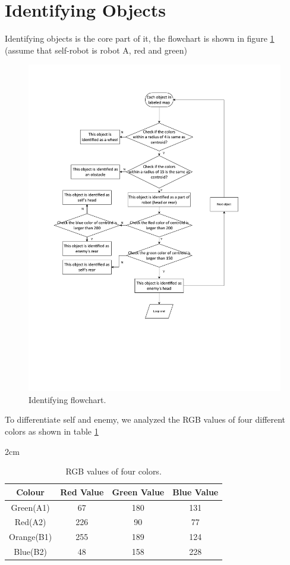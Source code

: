 \section{Identifying Objects}

Identifying objects is the core part of it, the flowchart is shown in figure \ref{Id_flow} (assume that self-robot is robot A, red and green)

\begin{figure}[thb]
    \centering
    \includegraphics[width=1\textwidth]{images/Id_flow.pdf}
    \caption[Identifying flowchart]{Identifying flowchart.}\label{Id_flow}
\end{figure}

To differentiate self and enemy, we analyzed the RGB values of four different colors as shown in table \ref{rgb_values}

\begin{table}[htbp]\small
    \addtolength{\leftskip} {2cm}
    \begin{tabular}{c|ccc}
    \hline 
    Colour&Red Value&Green Value&Blue Value\\
    \hline 
    Green(A1)&67&180&131\\
    Red(A2)&226&90&77\\
    Orange(B1)&255&189&124\\
    Blue(B2)&48&158&228\\
    \hline 
    \end{tabular}
    \caption[RGB values of four colors]{RGB values of four colors.}\label{rgb_values}
    \end{table}

